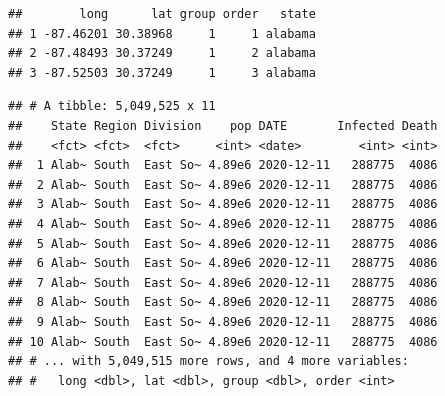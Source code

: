 \documentclass[]{book}
\newenvironment{Shaded}{\begin{snugshade}}{\end{snugshade}}
\newcommand{\KeywordTok}[1]{\textcolor[rgb]{0.13,0.29,0.53}{\textbf{#1}}}
\newcommand{\DataTypeTok}[1]{\textcolor[rgb]{0.13,0.29,0.53}{#1}}
\newcommand{\DecValTok}[1]{\textcolor[rgb]{0.00,0.00,0.81}{#1}}
\newcommand{\StringTok}[1]{\textcolor[rgb]{0.31,0.60,0.02}{#1}}
\newcommand{\OperatorTok}[1]{\textcolor[rgb]{0.81,0.36,0.00}{\textbf{#1}}}
\newcommand{\NormalTok}[1]{#1}
\begin{document}
\begin{Shaded}
\end{Shaded}

\begin{verbatim}
##        long      lat group order   state
## 1 -87.46201 30.38968     1     1 alabama
## 2 -87.48493 30.37249     1     2 alabama
## 3 -87.52503 30.37249     1     3 alabama
\end{verbatim}

\begin{Shaded}
\end{Shaded}

\begin{verbatim}
## # A tibble: 5,049,525 x 11
##    State Region Division    pop DATE       Infected Death
##    <fct> <fct>  <fct>     <int> <date>        <int> <int>
##  1 Alab~ South  East So~ 4.89e6 2020-12-11   288775  4086
##  2 Alab~ South  East So~ 4.89e6 2020-12-11   288775  4086
##  3 Alab~ South  East So~ 4.89e6 2020-12-11   288775  4086
##  4 Alab~ South  East So~ 4.89e6 2020-12-11   288775  4086
##  5 Alab~ South  East So~ 4.89e6 2020-12-11   288775  4086
##  6 Alab~ South  East So~ 4.89e6 2020-12-11   288775  4086
##  7 Alab~ South  East So~ 4.89e6 2020-12-11   288775  4086
##  8 Alab~ South  East So~ 4.89e6 2020-12-11   288775  4086
##  9 Alab~ South  East So~ 4.89e6 2020-12-11   288775  4086
## 10 Alab~ South  East So~ 4.89e6 2020-12-11   288775  4086
## # ... with 5,049,515 more rows, and 4 more variables:
## #   long <dbl>, lat <dbl>, group <dbl>, order <int>
\end{verbatim}
\end{document}
